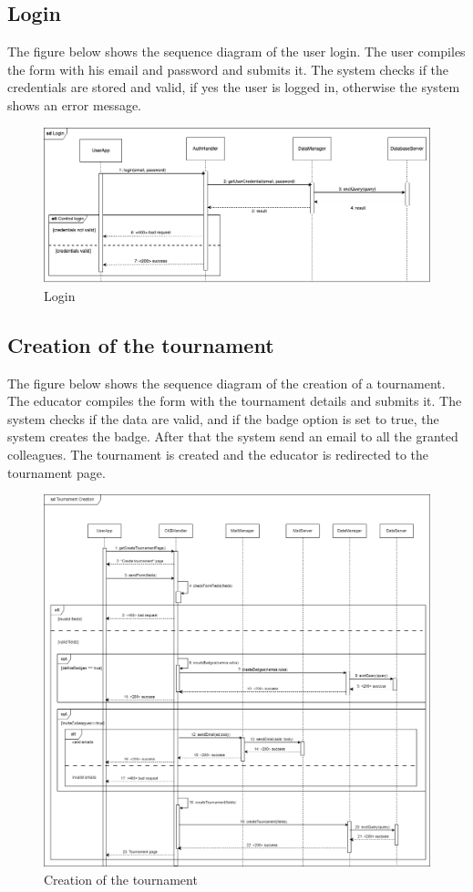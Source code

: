 \subsection{Login}
The figure below shows the sequence diagram of the user login. The user compiles the form with his email and password and submits it. 
The system checks if the credentials are stored and valid, if yes the user is logged in, otherwise the system shows an error message.
\begin{figure}[H]
    \centering
    \includegraphics[width=1\textwidth]{images/seq_diagrams/Login_DD.png}
    \caption{Login}
\end{figure}
\clearpage

\subsection{Creation of the tournament}
The figure below shows the sequence diagram of the creation of a tournament. The educator compiles the form
 with the tournament details and submits it. The system checks if the data are valid, and if the badge option is set to true, the system creates the badge.
 After that the system send an email to all the granted colleagues. The tournament is created and the educator is redirected to the tournament page.

 \begin{figure}[H]
    \centering
    \includegraphics[width=1\textwidth]{images/seq_diagrams/tournament_creation_DD.png}
    \caption{Creation of the tournament}
\end{figure}
\clearpage


